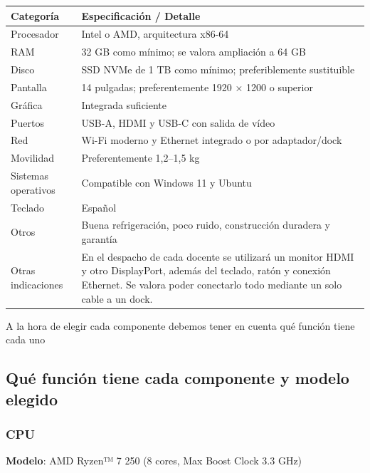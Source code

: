 \documentclass[11.5pt]{article}
\begin{document}
	\begin{table}[H]
		\centering

		\begin{tabularx}{\textwidth}{|l|X|}
			\hline
			\textbf{Categoría} & \textbf{Especificación / Detalle} \\
			\hline
			{Procesador} & {Intel o AMD, arquitectura x86-64} \\
			\hline
			{RAM} & {}32 GB como mínimo; se valora ampliación a 64 GB \\
			\hline
			{Disco} & {SSD NVMe de 1 TB como mínimo; preferiblemente sustituible} \\
			\hline
			{Pantalla} & {14 pulgadas; preferentemente 1920 × 1200 o superior} \\
			\hline
			{Gráfica} & {Integrada suficiente} \\
			\hline
			{Puertos} & {USB-A, HDMI y USB-C con salida de vídeo} \\
			\hline
			{Red} & {Wi-Fi moderno y Ethernet integrado o por adaptador/dock} \\
			\hline
			{Movilidad} & {Preferentemente 1,2–1,5 kg} \\
			\hline
			{Sistemas operativos} & {Compatible con Windows 11 y Ubuntu} \\
			\hline
			{Teclado} & {Español} \\
			\hline
			{Otros} & {Buena refrigeración, poco ruido, construcción duradera y garantía} \\
			\hline
			{Otras indicaciones} & {En el despacho de cada docente se utilizará un monitor HDMI y otro DisplayPort, además del teclado, ratón y conexión Ethernet. Se valora poder conectarlo todo mediante un solo cable a un dock.} \\
			\hline
		\end{tabularx}
	\end{table}
	
	A la hora de elegir cada componente debemos tener en cuenta qué función tiene cada uno
	\subsection{Qué función tiene cada componente y modelo elegido}
	\subsubsection*{CPU}
	
	\textbf{Modelo}: AMD Ryzen™ 7 250 (8 cores, Max Boost Clock 3.3 GHz)
	
\end{document}
